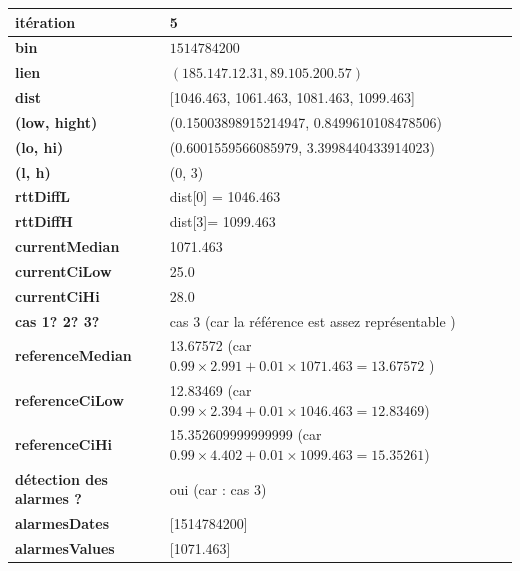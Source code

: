 \begin{table}[H]
	\centering
	
	\begin{tabularx}{\linewidth}{|l|X| }
		\hline
		\textbf{itération} & 5	\\ \hline
		\textbf{bin} & $1514784200$ \\ \hline
		\textbf{lien} & $(185.147.12.31, 89.105.200.57)$  \\ \hline
		\textbf{dist}& [1046.463, 1061.463, 1081.463, 1099.463]	\\ \hline
		\textbf{(low, hight)}& (0.15003898915214947, 0.8499610108478506) 	\\ \hline
		\textbf{(lo, hi)}&(0.6001559566085979, 3.3998440433914023)  \\ \hline
		\textbf{(l, h)} & (0, 3) 	\\ \hline
		\textbf{rttDiffL}& dist[0] = 1046.463	\\ \hline
		\textbf{rttDiffH}& dist[3]= 1099.463	\\ \hline
		\textbf{currentMedian}& 1071.463	\\ \hline
		\textbf{currentCiLow}& 25.0 	\\ \hline
		\textbf{currentCiHi}& 28.0	\\ \hline
		\textbf{cas 1? 2? 3?}& cas 3 (car la référence est assez représentable )  \\ \hline
		\textbf{referenceMedian}& 13.67572 (car $ 0.99×2.991 + 0.01×1071.463 = 13.67572 $ ) 	\\ \hline
		\textbf{referenceCiLow}& 12.83469  (car $ 0.99×2.394+ 0.01×1046.463 = 12.83469  $)	\\ \hline
		\textbf{referenceCiHi}& 15.352609999999999 (car $ 0.99×4.402 + 0.01×1099.463 = 15.35261 $)	\\ \hline
		\textbf{détection des alarmes ?}& oui (car : cas 3)	\\ \hline
		\textbf{alarmesDates}& [1514784200]	\\ \hline
		\textbf{alarmesValues}& [1071.463]	\\ \hline
		
	\end{tabularx}
\end{table}



